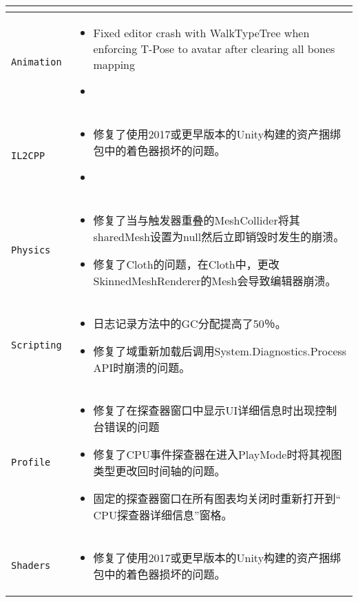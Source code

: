 \documentclass[UTF8,a4paper,12pt]{ctexart}
\begin{document}
\begin{longtable}{p{2cm}|p{14cm}}
\begin{itemize}
											\end{itemize}			\\
				\hline
				\verb|Animation |  &	
											\begin{itemize}
											\item Fixed editor crash with WalkTypeTree when enforcing T-Pose to avatar after clearing all bones mapping
											\item 
											\end{itemize}			\\											
				\hline
				\verb|IL2CPP| & 			
											\begin{itemize}
											\item  修复了使用2017或更早版本的Unity构建的资产捆绑包中的着色器损坏的问题。
											\item 
											\end{itemize}			\\											
				\hline
				\verb|Physics| & 		
											\begin{itemize}
											\item 修复了当与触发器重叠的MeshCollider将其sharedMesh设置为null然后立即销毁时发生的崩溃。
											\item 修复了Cloth的问题，在Cloth中，更改SkinnedMeshRenderer的Mesh会导致编辑器崩溃。
											\end{itemize}			\\
				\hline
				\verb|Scripting| & 			
											\begin{itemize}
											\item 日志记录方法中的GC分配提高了50％。
											\item 修复了域重新加载后调用System.Diagnostics.Process API时崩溃的问题。
											\end{itemize}			\\
				\hline
				\verb|Profile| & 			
											\begin{itemize}
											\item 修复了在探查器窗口中显示UI详细信息时出现控制台错误的问题
											\item 修复了CPU事件探查器在进入PlayMode时将其视图类型更改回时间轴的问题。
											\item 固定的探查器窗口在所有图表均关闭时重新打开到“ CPU探查器详细信息”窗格。
											\end{itemize}			\\											
				\hline
				\verb|Shaders| & 			
											\begin{itemize}
											\item  修复了使用2017或更早版本的Unity构建的资产捆绑包中的着色器损坏的问题。

\end{itemize}
\end{longtable}
\end{document}
